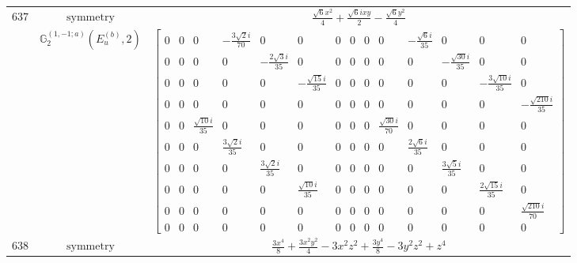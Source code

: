 \documentclass[fleqn,8pt,landscape]{jsarticle}
\begin{document}
\begin{longtable}{ccc}
$ 637 $ & $ \text{symmetry} $ & $ \frac{\sqrt{6} x^{2}}{4} + \frac{\sqrt{6} i x y}{2} - \frac{\sqrt{6} y^{2}}{4} $ \\
$  $ & $ \mathbb{G}_{2}^{(1,-1;a)}(E_{u}^{(b)},2) $ & $ \begin{bmatrix} 0 & 0 & 0 & - \frac{3 \sqrt{2} i}{70} & 0 & 0 & 0 & 0 & 0 & 0 & - \frac{\sqrt{6} i}{35} & 0 & 0 & 0 \\ 0 & 0 & 0 & 0 & - \frac{2 \sqrt{3} i}{35} & 0 & 0 & 0 & 0 & 0 & 0 & - \frac{\sqrt{30} i}{35} & 0 & 0 \\ 0 & 0 & 0 & 0 & 0 & - \frac{\sqrt{15} i}{35} & 0 & 0 & 0 & 0 & 0 & 0 & - \frac{3 \sqrt{10} i}{35} & 0 \\ 0 & 0 & 0 & 0 & 0 & 0 & 0 & 0 & 0 & 0 & 0 & 0 & 0 & - \frac{\sqrt{210} i}{35} \\ 0 & 0 & \frac{\sqrt{10} i}{35} & 0 & 0 & 0 & 0 & 0 & 0 & \frac{\sqrt{30} i}{70} & 0 & 0 & 0 & 0 \\ 0 & 0 & 0 & \frac{3 \sqrt{2} i}{35} & 0 & 0 & 0 & 0 & 0 & 0 & \frac{2 \sqrt{6} i}{35} & 0 & 0 & 0 \\ 0 & 0 & 0 & 0 & \frac{3 \sqrt{2} i}{35} & 0 & 0 & 0 & 0 & 0 & 0 & \frac{3 \sqrt{5} i}{35} & 0 & 0 \\ 0 & 0 & 0 & 0 & 0 & \frac{\sqrt{10} i}{35} & 0 & 0 & 0 & 0 & 0 & 0 & \frac{2 \sqrt{15} i}{35} & 0 \\ 0 & 0 & 0 & 0 & 0 & 0 & 0 & 0 & 0 & 0 & 0 & 0 & 0 & \frac{\sqrt{210} i}{70} \\ 0 & 0 & 0 & 0 & 0 & 0 & 0 & 0 & 0 & 0 & 0 & 0 & 0 & 0 \end{bmatrix} $ \\ \hline
$ 638 $ & $ \text{symmetry} $ & $ \frac{3 x^{4}}{8} + \frac{3 x^{2} y^{2}}{4} - 3 x^{2} z^{2} + \frac{3 y^{4}}{8} - 3 y^{2} z^{2} + z^{4} $ \\

\end{longtable}
\end{document}
